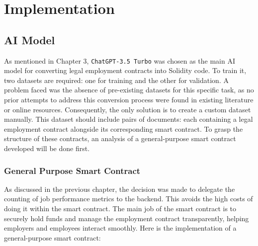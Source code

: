 \chapter{Implementation}

\section{AI Model}

As mentioned in Chapter 3, \texttt{ChatGPT-3.5 Turbo} was chosen as the main AI model for converting legal employment contracts into Solidity code. To train it, two datasets are required: one for training and the other for validation. A problem faced was the absence of pre-existing datasets for this specific task, as no prior attempts to address this conversion process were found in existing literature or online resources. Consequently, the only solution is to create a custom dataset manually. This dataset should include pairs of documents:  each containing a legal employment contract alongside its corresponding smart contract. To grasp the structure of these contracts, an analysis of a general-purpose smart contract developed will be done first. %

\subsection{General Purpose Smart Contract}

As discussed in the previous chapter, the decision was made to delegate the counting of job performance metrics to the backend. This avoids the high costs of doing it within the smart contract. The main job of the smart contract is to securely hold funds and manage the employment contract transparently, helping employers and employees interact smoothly. Here is the implementation of a general-purpose smart contract:

